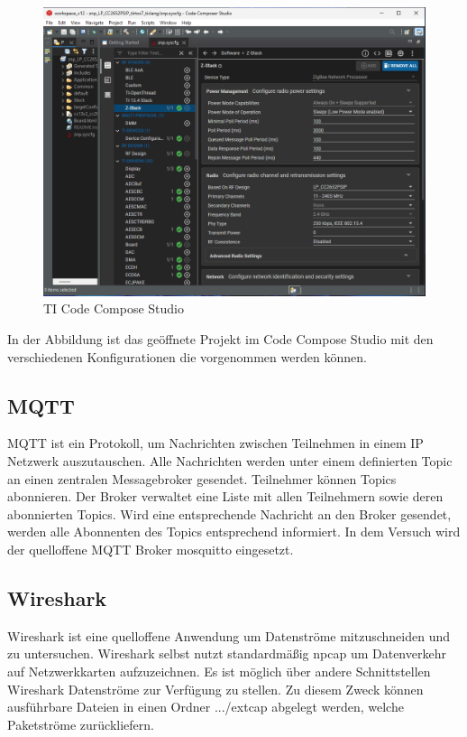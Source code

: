 \begin{figure}[H]
  \centering
  \includegraphics[width=1\textwidth]{media/cc-device.png}
  \caption{TI Code Compose Studio}
\end{figure}
In der Abbildung ist das geöffnete Projekt im Code Compose Studio mit den verschiedenen Konfigurationen die vorgenommen werden können.

\subsection{MQTT}

MQTT \cite{mqtt} ist ein Protokoll, um Nachrichten zwischen Teilnehmen in einem IP Netzwerk auszutauschen. Alle Nachrichten werden unter einem definierten Topic
an einen zentralen Messagebroker gesendet. Teilnehmer können Topics abonnieren. Der Broker verwaltet eine Liste mit allen Teilnehmern sowie 
deren abonnierten Topics. Wird eine entsprechende Nachricht an den Broker gesendet, werden alle Abonnenten des Topics entsprechend informiert.
In dem Versuch wird der quelloffene MQTT Broker \grqq mosquitto\grqq{} eingesetzt. 

\subsection{Wireshark}

Wireshark ist eine quelloffene Anwendung um Datenströme mitzuschneiden und zu untersuchen. Wireshark selbst nutzt standardmäßig \grqq npcap\grqq{} um Datenverkehr 
auf Netzwerkkarten aufzuzeichnen. Es ist möglich über andere Schnittstellen Wireshark Datenströme zur Verfügung zu stellen. Zu diesem Zweck
können ausführbare Dateien in einen Ordner \grqq .../extcap\grqq{} abgelegt werden, welche Paketströme zurückliefern. 

